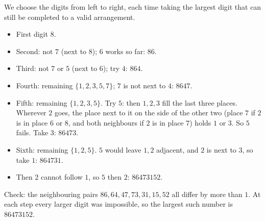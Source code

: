 We choose the digits from left to right, each time taking the largest digit that can still be completed to a valid arrangement.
\begin{itemize}
\item First digit $8$.
\item Second: not $7$ (next to $8$); $6$ works so far: $86$.
\item Third: not $7$ or $5$ (next to $6$); try $4$: $864$.
\item Fourth: remaining $\{1,2,3,5,7\}$; $7$ is not next to $4$: $8647$.
\item Fifth: remaining $\{1,2,3,5\}$. Try $5$: then $1,2,3$ fill the last three places. Wherever $2$ goes, the place next to it on the side of the other two (place $7$ if $2$ is in place $6$ or $8$, and both neighbours if $2$ is in place $7$) holds $1$ or $3$. So $5$ fails. Take $3$: $86473$.
\item Sixth: remaining $\{1,2,5\}$. $5$ would leave $1,2$ adjacent, and $2$ is next to $3$, so take $1$: $864731$.
\item Then $2$ cannot follow $1$, so $5$ then $2$: $86473152$.
\end{itemize}
Check: the neighbouring pairs $86,64,47,73,31,15,52$ all differ by more than $1$. At each step every larger digit was impossible, so the largest such number is $\boxed{86473152}$.
